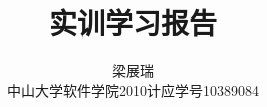 \documentclass[11pt,a4paper]{article}
\begin{document}
\title{实训学习报告}
\author{梁展瑞 \\ {\small 中山大学软件学院\hspace{24pt}2010计应\hspace{24pt}学号10389084}}
\maketitle



\end{document}
